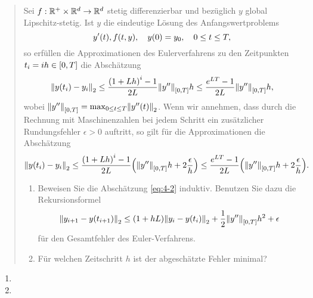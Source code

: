 \documentclass{exercise}
\begin{document}
	\section{}

	\begin{quote}
		Sei \(f: \R^+ \times \R^d \to \R^d\) stetig differenzierbar und bezüglich \(y\) global Lipschitz-stetig.
		Ist \(y\) die eindeutige Lösung des Anfangswertproblems
		\[
			y'\parentheses*{t}, f\parentheses*{t, y}, \quad y\parentheses*{0} = y_0, \quad 0 \le t \le T,
		\]
		so erfüllen die Approximationen des Eulerverfahrens zu den Zeitpunkten \(t_i = ih \in \brackets*{0, T}\) die Abschätzung
		\begin{equation}
			\norm*{y\parentheses*{t_i} - y_i}_2 \le \frac{\parentheses*{1 + Lh}^i - 1}{2L}\norm*{y''}_{\brackets*{0, T}}h \le \frac{e^{LT} - 1}{2L}\norm*{y''}_{\brackets*{0, T}}h,
		\end{equation}
		wobei \(\norm*{y''}_{\brackets*{0, T}} = \max_{0 \le t \le T}\norm*{y''\parentheses*{t}}_2\).
		Wenn wir annehmen, dass durch die Rechnung mit Maschinenzahlen bei jedem Schritt ein zusätzlicher Rundungsfehler \(\epsilon > 0\) auftritt, so gilt für die Approximationen die Abschätzung
		\begin{equation}\label{eq:4-2}
			\norm*{y\parentheses*{t_i} - y_i}_2 \le \frac{\parentheses*{1 + Lh}^i - 1}{2L}\parentheses*{\norm*{y''}_{\brackets*{0, T}}h + 2\frac{\epsilon}{h}} \le \frac{e^{LT} - 1}{2L}\parentheses*{\norm*{y''}_{\brackets*{0, T}}h + 2\frac{\epsilon}{h}}.
		\end{equation}
		\begin{enumerate}
			\item Beweisen Sie die Abschätzung \eqref{eq:4-2} induktiv.
			Benutzen Sie dazu die Rekursionsformel
			\[
				\norm*{y_{i + 1} - y\parentheses*{t_{i + 1}}}_2 \le \parentheses*{1 + hL}\norm*{y_i - y\parentheses*{t_i}}_2 + \frac{1}{2}\norm*{y''}_{\brackets*{0, T}}h^2 + \epsilon
			\]
			für den Gesamtfehler des Euler-Verfahrens.
			\item Für welchen Zeitschritt \(h\) ist der abgeschätzte Fehler minimal?
		\end{enumerate}
	\end{quote}

	\begin{enumerate}
		\item
		\item
	\end{enumerate}
\end{document}
